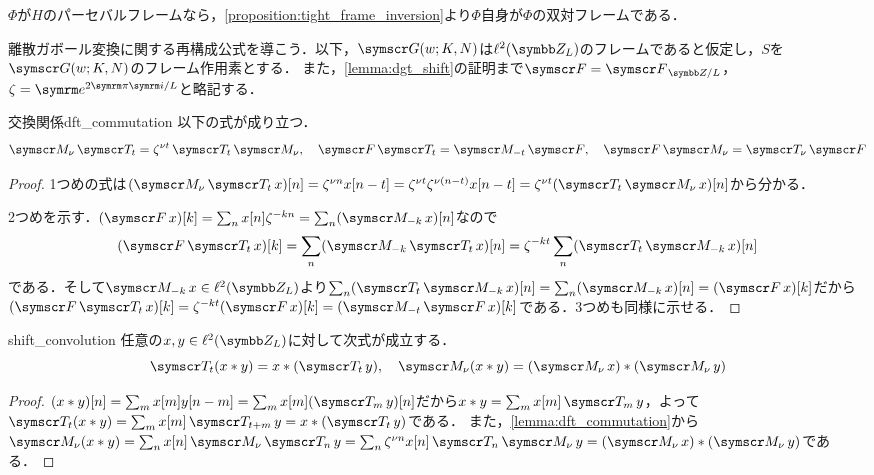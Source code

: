 \documentclass[../../main]{subfiles}
\begin{document}
\begin{example}
  \(\Phi\)が\(H\)のパーセバルフレームなら，\cref{proposition:tight_frame_inversion}より\(\Phi\)自身が\(\Phi\)の双対フレームである．
\end{example}

離散ガボール変換に関する再構成公式を導こう．以下，\(\gaborsys{w}{K}{N}\)は\(\cycles{L}\)のフレームであると仮定し，\(S\)を\(\gaborsys{w}{K}{N}\)のフレーム作用素とする．
また，\cref{lemma:dgt_shift}の証明まで\(\ftrans=\dft{L}\)，\(\zeta=\napr^{2\krez\iuni/L}\)と略記する．

\begin{lemma}{交換関係}{dft_commutation}
  以下の式が成り立つ．
  \[
    \modulate{\nu}\translate{t} = \zeta^{\nu t}\translate{t}\modulate{\nu},
    \quad\ftrans\translate{t} = \modulate{-t}\ftrans,
    \quad\ftrans\modulate{\nu} = \translate{\nu}\ftrans
  \]
\end{lemma}

\begin{proof}
  1つめの式は\((\modulate{\nu}\translate{t}x)[n]=\zeta^{\nu n}x[n-t]=\zeta^{\nu t}\zeta^{\nu(n-t)}x[n-t]=\zeta^{\nu t}(\translate{t}\modulate{\nu}x)[n]\)から分かる．

  2つめを示す．\((\ftrans x)[k]=\sum_nx[n]\zeta^{-kn}=\sum_n(\modulate{-k}x)[n]\)なので
  \[
    (\ftrans\translate{t}x)[k] = \sum_n(\modulate{-k}\translate{t}x)[n]
    = \zeta^{-kt}\sum_n(\translate{t}\modulate{-k}x)[n]
  \]
  である．そして\(\modulate{-k}x\in\cycles{L}\)より\(\sum_n(\translate{t}\modulate{-k}x)[n]=\sum_n(\modulate{-k}x)[n]=(\ftrans x)[k]\)だから\((\ftrans\translate{t}x)[k]=\zeta^{-kt}(\ftrans x)[k]=(\modulate{-t}\ftrans x)[k]\)である．3つめも同様に示せる．
\end{proof}

\begin{lemma}{}{shift_convolution}
  任意の\(x,y\in\cycles{L}\)に対して次式が成立する．
  \[
    \translate{t}(x\circconv y) = x\circconv(\translate{t}y),
    \quad\modulate{\nu}(x\circconv y) = (\modulate{\nu}x)\circconv(\modulate{\nu}y)
  \]
\end{lemma}

\begin{proof}
  \((x\circconv y)[n]=\sum_mx[m]y[n-m]=\sum_mx[m](\translate{m}y)[n]\)だから\(x\circconv y=\sum_mx[m]\translate{m}y\)，よって\(\translate{t}(x\circconv y)=\sum_mx[m]\translate{t+m}y=x\circconv(\translate{t}y)\)である．
  また，\cref{lemma:dft_commutation}から\(\modulate{\nu}(x\circconv y)=\sum_nx[n]\modulate{\nu}\translate{n}y=\sum_n\zeta^{\nu n}x[n]\translate{n}\modulate{\nu}y=(\modulate{\nu}x)\circconv(\modulate{\nu}y)\)である．
\end{proof}
\end{document}
